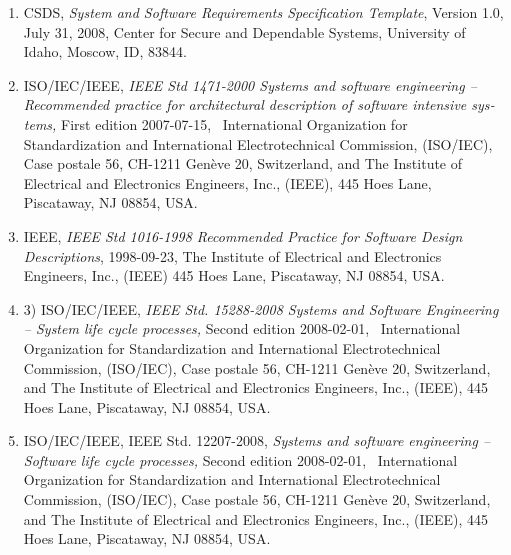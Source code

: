 \documentclass[twoside,letterpaper]{article}
\newcommand\liststyleWWviiiNumii{%
\renewcommand\theenumi{\arabic{enumi}}
\renewcommand\theenumii{\arabic{enumii}}
\renewcommand\theenumiii{\arabic{enumiii}}
\renewcommand\theenumiv{\arabic{enumiv}}
\renewcommand\labelenumi{\theenumi)}
\renewcommand\labelenumii{\theenumii.}
\renewcommand\labelenumiii{\theenumiii.}
\renewcommand\labelenumiv{\theenumiv.}
}
\begin{document}
{\liststyleWWviiiNumii
\begin{enumerate}
\item {\color{black}
\foreignlanguage{english}{CSDS,
}\foreignlanguage{english}{\textit{System and Software Requirements
Specification Template}}\foreignlanguage{english}{, Version 1.0, July
31, 2008, Center for Secure and Dependable Systems, University of
Idaho, Moscow, ID, 83844.}}
\item {\color{black}
\foreignlanguage{english}{ISO/IEC/IEEE,
}\foreignlanguage{english}{\textit{IEEE Std 1471-2000 Systems and
software engineering -- Recommended practice for architectural
description of software intensive systems,}}\foreignlanguage{english}{
First edition 2007-07-15, \ International Organization for
Standardization and International Electrotechnical Commission,
(ISO/IEC), Case postale 56, CH-1211 Gen\`{e}ve 20, Switzerland, and The
Institute of Electrical and Electronics Engineers, Inc., (IEEE), 445
Hoes Lane, Piscataway, NJ 08854, USA.}}
\item {\color{black}
\foreignlanguage{english}{IEEE, }\foreignlanguage{english}{\textit{IEEE
Std 1016-1998 Recommended Practice for Software Design
Descriptions}}\foreignlanguage{english}{, 1998-09-23, The Institute of
Electrical and Electronics Engineers, Inc., (IEEE) 445 Hoes Lane,
Piscataway, NJ 08854, USA.}}
\item {\color{black}
\foreignlanguage{english}{3) ISO/IEC/IEEE,
}\foreignlanguage{english}{\textit{IEEE Std. 15288-2008 Systems and
Software Engineering -- System life cycle
processes,}}\foreignlanguage{english}{ Second edition 2008-02-01,
\ International Organization for Standardization and International
Electrotechnical Commission, (ISO/IEC), Case postale 56, CH-1211 Gen\`{e}ve
20, Switzerland, and The Institute of Electrical and Electronics
Engineers, Inc., (IEEE), 445 Hoes Lane, Piscataway, NJ 08854, USA.}}
\item {\color{black}
\foreignlanguage{english}{ISO/IEC/IEEE, IEEE Std. 12207-2008,
}\foreignlanguage{english}{\textit{Systems and software engineering --
Software life cycle processes, }}\foreignlanguage{english}{Second
edition 2008-02-01, \ International Organization for Standardization
and International Electrotechnical Commission, (ISO/IEC), Case postale
56, CH-1211 }\foreignlanguage{english}{Gen\`{e}ve 20, Switzerland, and The
Institute of Electrical and Electronics Engineers, Inc., (IEEE), 445
Hoes Lane, Piscataway, NJ 08854, USA.}}
\end{enumerate}
}
\end{document}
